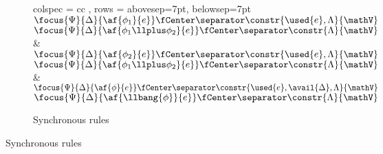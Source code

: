 \begin{figure}[h!]
	\ContinuedFloat
	\begin{subfigure}{\textwidth}
		\centering
		\begin{tblr}{ colspec = { cc } 
			    , rows = {abovesep=7pt, belowsep=7pt}
			    }
			 {\footnotesize
			\LeftLabel{\derRule{\displayten}}
			\DP}
			\\ 
			{\footnotesize
			\AX$\focus{\Psi}{\Delta}{\af{\phi_1}{e}} \fCenter \separator \constr{\used{e}, \Lambda}{\mathV}$
			\LeftLabel{\derRule{\displayplus[L]}}
			\UI$\focus{\Psi}{\Delta}{\af{\phi_1 \llplus \phi_2}{e}} \fCenter \separator \constr{\Lambda}{\mathV}$
			\DP}
			&
			{\footnotesize
			\AX$\focus{\Psi}{\Delta}{\af{\phi_2}{e}} \fCenter \separator \constr{\used{e}, \Lambda}{\mathV}$
			\LeftLabel{\derRule{\displayplus[R]}}
			\UI$\focus{\Psi}{\Delta}{\af{\phi_1 \llplus \phi_2}{e}} \fCenter \separator \constr{\Lambda}{\mathV}$
			\DP}
			\\
			{\footnotesize
			\LeftLabel{\derRule{\displayone}}
			\DP} 
			&
			{\footnotesize
			\AX$\focus{\Psi}{\Delta}{\af{\phi}{e}} \fCenter \separator \constr{\used{e}, \avail{\Delta}, \Lambda }{\mathV}$
			\LeftLabel{\derRule{\displaybang}}
			\UI$\focus{\Psi}{\Delta}{\af{\llbang{\phi}}{e}} \fCenter \separator \constr{\Lambda}{\mathV}$
			\DP
			}
			\\
			 {\footnotesize
			\LeftLabel{\derRule{\displaytoasy}}
			\DP
			}
		\end{tblr}
		\caption{Synchronous rules}
	\end{subfigure}
\end{figure}
